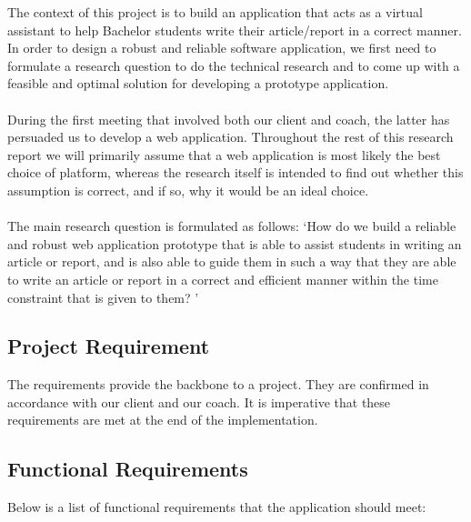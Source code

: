 The context of this project is to build an application that acts as a virtual assistant to help Bachelor students write their article/report in a correct manner. In order to design a robust and reliable software application, we first need to formulate a research question to do the technical research and to come up with a feasible and optimal solution for developing a prototype application.\\\\

During the first meeting that involved both our client and coach, the latter has persuaded us to develop a web application. Throughout the rest of this research report we will primarily assume that a web application is most likely the best choice of platform, whereas the research itself is intended to find out whether this assumption is correct, and if so, why it would be an ideal choice. \\\\

The main research question is formulated as follows: `How do we build a reliable and robust web application prototype that is able to assist students in writing an article or report, and is also able to guide them in such a way that they are able to write an article or report in a correct and efficient manner within the time constraint that is given to them? '

\subsection{Project Requirement}

The requirements provide the backbone to a project. They are confirmed in accordance with our client and our coach. It is imperative that these requirements are met at the end of the implementation.

\subsection{Functional Requirements} %
\label{sub:functional_requirement}

Below is a list of functional requirements that the application should meet:

